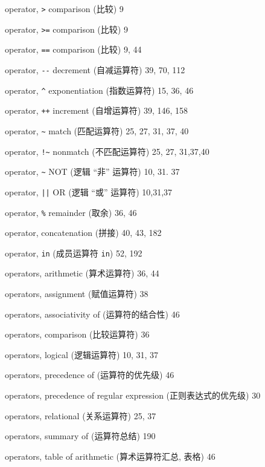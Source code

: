 \begin{multicols}{2}
\hangindent=2pc  operator, \verb'>' comparison (比较) 9

\hangindent=2pc  operator, \verb'>=' comparison (比较) 9

\hangindent=2pc  operator, \verb'==' comparison (比较) 9, 44

\hangindent=2pc  operator, \verb'--' decrement (自减运算符)
39, 70, 112

\hangindent=2pc  operator, \verb'^' exponentiation (指数运算符)
15, 36, 46

\hangindent=2pc  operator, \verb'++' increment (自增运算符)
39, 146, 158

\hangindent=2pc  operator, \verb'~' match (匹配运算符) 25, 27, 31, 37, 40

\hangindent=2pc  operator, \verb'!~' nonmatch (不匹配运算符)
25, 27, 31,37,40

\hangindent=2pc  operator, \verb'~' NOT (逻辑 ``非'' 运算符)
10, 31. 37

\hangindent=2pc  operator, \verb'||' OR (逻辑 ``或'' 运算符)
10,31,37

\hangindent=2pc  operator, \verb'%' remainder (取余) 36, 46

\hangindent=2pc  operator, concatenation (拼接) 40, 43,  182

\hangindent=2pc  operator, \verb'in' (成员运算符 \verb'in') 52, 192

\hangindent=2pc  operators, arithmetic (算术运算符) 36, 44

\hangindent=2pc  operators, assignment (赋值运算符) 38

\hangindent=2pc  operators, associativity of (运算符的结合性) 46

\hangindent=2pc  operators, comparison (比较运算符) 36

\hangindent=2pc  operators, logical (逻辑运算符) 10, 31, 37

\hangindent=2pc  operators, precedence of (运算符的优先级) 46

\hangindent=2pc  operators, precedence of regular expression
(正则表达式的优先级) 30

\hangindent=2pc  operators, relational (关系运算符) 25, 37

\hangindent=2pc  operators, summary of (运算符总结) 190

\hangindent=2pc  operators, table of arithmetic (算术运算符汇总,
表格) 46


\end{multicols}

